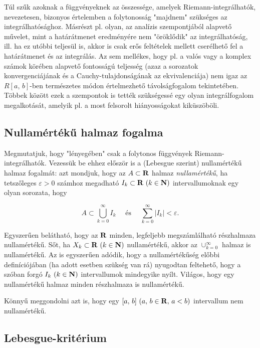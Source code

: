 
Túl szűk azoknak a függvényeknek az összessége, amelyek Riemann-integrálhatók, nevezetesen, bizonyos értelemben a folytonosság "majdnem" szükséges az integrálhatósághoz. Másrészt pl. olyan, az analízis szempontjából alapvető művelet, mint a határátmenet eredményére nem "öröklődik" az integrálhatóság, ill. ha ez utóbbi teljesül is, akkor is csak erős feltételek mellett cserélhető fel a határátmenet és az integrálás. Az sem mellékes, hogy pl. a valós vagy a komplex számok körében alapvető fontosságú teljesség (azaz a sorozatok konvergenciájának és a Cauchy-tulajdonságának az
ekvivalenciája) nem igaz az $R[a, \, b]$-ben természetes módon értelmezhető távolságfogalom tekintetében. Többek között ezek a szempontok is tették szükségessé egy olyan integrálfogalom megalkotását, amelyik pl. a most felsorolt hiányosságokat kiküszöböli.

\subsection{Nullamértékű halmaz fogalma}

Megmutatjuk, hogy "lényegében" csak a folytonos függvények Riemann-integrálhatók. Vezessük be ehhez először is a (Lebesgue szerint) nullamértékű halmaz fogalmát: azt mondjuk, hogy az $A \subset \mathbf{R}$ halmaz \textit{nullamértékű}, ha tetszőleges $\varepsilon > 0$ számhoz megadható $I_k \subset \mathbf{R} \, \, (k \in \mathbf{N})$ intervallumoknak egy olyan sorozata, hogy

\[
	A \subset \bigcup_{k=0}^\infty I_k \quad \text{ és } \quad \sum_{k=0}^\infty |I_k| < \varepsilon.
\]

Egyszerűen belátható, hogy az $\mathbf{R}$ minden, legfeljebb megszámlálható részhalmaza nullamértékű. Sőt, ha $X_k \subset \mathbf{R} \, \, (k \in \mathbf{N})$ nullamértékű, akkor az $\cup_{k=0}^\infty$ halmaz is nullamértékű. Az is egyszerűen adódik, hogy a nullamértékűség előbbi definíciójában (ha adott esetben szükség van rá) nyugodtan feltehető, hogy a szóban forgó $I_k \, \, (k \in \mathbf{N})$ intervallumok mindegyike nyílt. Világos, hogy egy nullamértékű halmaz minden részhalmaza is nullamértékű.

Könnyű meggondolni azt is, hogy egy $[a, \, b] \, \, (a, \, b \in \mathbf{R}, \, a < b)$ intervallum nem nullamértékű.

\subsection{Lebesgue-kritérium}

